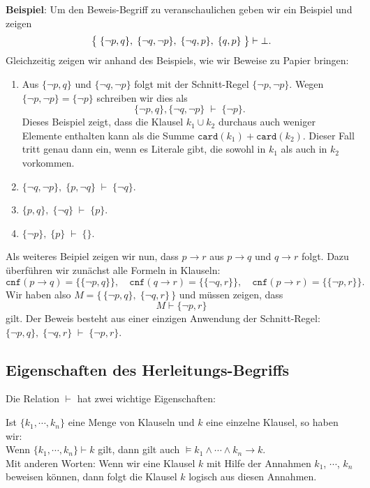 \noindent
\textbf{Beispiel}:  Um den Beweis-Begriff zu veranschaulichen geben wir ein Beispiel und
zeigen 
\[ \bigl\{\; \{\neg p, q\},\; \{ \neg q, \neg p \},\; \{ \neg q, p \},\; \{ q, p \}\; \bigr\} \vdash \bot.
\]
Gleichzeitig zeigen wir anhand des Beispiels, wie wir Beweise zu Papier bringen:
\begin{enumerate}
\item Aus $\{\neg p, q \}$ und $\{ \neg q, \neg p \}$ folgt mit der Schnitt-Regel   
      $\{ \neg p, \neg p \}$.   Wegen $\{ \neg p, \neg p \} = \{ \neg p \}$
      schreiben wir dies als 
      \[ \{\neg p, q \}, \{ \neg q, \neg p \} \;\vdash\; \{ \neg p \}. \]
      \remark
      Dieses Beispiel zeigt, dass die Klausel $k_1 \cup k_2$ durchaus auch weniger
      Elemente enthalten kann als die Summe $\mathtt{card}(k_1) + \mathtt{card}(k_2)$.  Dieser
      Fall tritt genau dann ein, wenn es Literale gibt, die sowohl in $k_1$ als auch in
      $k_2$ vorkommen.
\item $\{\neg q, \neg p \},\; \{ p, \neg q \} \;\vdash\; \{ \neg q \}$. 
\item $\{ p, q \},\; \{ \neg q \} \;\vdash\; \{ p \}$. 
\item $\{ \neg p \},\; \{ p \} \;\vdash\; \{\}$. 
\end{enumerate}
Als weiteres Beipiel zeigen wir nun, dass $p \rightarrow r$ aus $p \rightarrow q$ und $q \rightarrow r$ 
folgt.  Dazu überführen wir zunächst alle Formeln in Klauseln: 
\[ \texttt{cnf}(p \rightarrow q) = \bigl\{ \{ \neg p, q \} \bigr\}, \quad
   \texttt{cnf}(q \rightarrow r) = \bigl\{ \{ \neg q, r \} \bigr\}, \quad 
   \texttt{cnf}(p \rightarrow r) = \bigl\{ \{ \neg p, r \} \bigr\}.
\]
Wir haben also $M = \bigl\{\, \{ \neg p, q \},\; \{ \neg q, r \}\,\bigr\}$ und müssen zeigen, dass
\[ M \vdash  \{ \neg p, r \} \]
gilt.  Der Beweis besteht aus einer einzigen Anwendung der Schnitt-Regel: 
\\[0.2cm]
\hspace*{1.3cm}
$ \{ \neg p, q \},\; \{ \neg q, r \} \;\vdash\; \{ \neg p, r \}$.  \eox

\subsection{Eigenschaften des Herleitungs-Begriffs}
Die Relation $\vdash$ hat zwei wichtige Eigenschaften:

\begin{Satz}
  Ist $\{k_1, \cdots, k_n \}$ eine Menge von Klauseln und $k$ eine einzelne Klausel,
  so haben wir:
  \\[0.2cm]
  \hspace*{3.3cm} Wenn $\{k_1, \cdots, k_n \} \vdash k$ gilt, dann gilt auch $\models k_1 \wedge \cdots \wedge
  k_n \rightarrow k$.
  \\[0.2cm]
  Mit anderen Worten: Wenn wir eine Klausel $k$ mit Hilfe der Annahmen $k_1$, $\cdots$, $k_n$ beweisen können,
  dann folgt die Klausel $k$ logisch aus diesen Annahmen.
\end{Satz}

